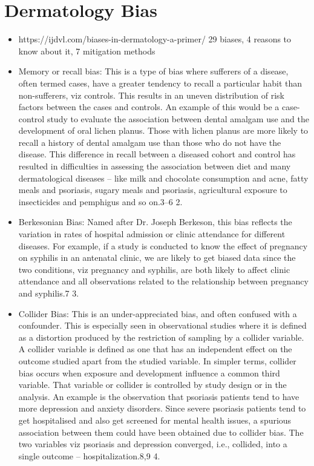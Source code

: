 \documentclass[12pt, a4paper, oneside]{book}   	%
\begin{document}
		\section{Dermatology Bias}
			\begin{itemize}
				\item https://ijdvl.com/biases-in-dermatology-a-primer/ 29 biases, 4 reasons to know about it, 7 mitigation methods \autocite{Chakraborty_2023}
				\item Memory or recall bias: This is a type of bias where sufferers of a disease, often termed cases, have a greater tendency to recall a particular habit than non-sufferers, viz controls. This results in an uneven distribution of risk factors between the cases and controls. An example of this would be a case-control study to evaluate the association between dental amalgam use and the development of oral lichen planus. Those with lichen planus are more likely to recall a history of dental amalgam use than those who do not have the disease. This difference in recall between a diseased cohort and control has resulted in difficulties in assessing the association between diet and many dermatological diseases – like milk and chocolate consumption and acne, fatty meals and psoriasis, sugary meals and psoriasis, agricultural exposure to insecticides and pemphigus and so on.3–6 2. \autocite{Chakraborty_2023}
				\item Berkesonian Bias: Named after Dr. Joseph Berkeson, this bias reflects the variation in rates of hospital admission or clinic attendance for different diseases. For example, if a study is conducted to know the effect of pregnancy on syphilis in an antenatal clinic, we are likely to get biased data since the two conditions, viz pregnancy and syphilis, are both likely to affect clinic attendance and all observations related to the relationship between pregnancy and syphilis.7 3. \autocite{Chakraborty_2023}
				\item Collider Bias: This is an under-appreciated bias, and often confused with a confounder. This is especially seen in observational studies where it is defined as a distortion produced by the restriction of sampling by a collider variable. A collider variable is defined as one that has an independent effect on the outcome studied apart from the studied variable. In simpler terms, collider bias occurs when exposure and development influence a common third variable. That variable or collider is controlled by study design or in the analysis. An example is the observation that psoriasis patients tend to have more depression and anxiety disorders. Since severe psoriasis patients tend to get hospitalised and also get screened for mental health issues, a spurious association between them could have been obtained due to collider bias. The two variables viz psoriasis and depression converged, i.e., collided, into a single outcome – hospitalization.8,9 4. \autocite{Chakraborty_2023}

\end{itemize}
\end{document}
